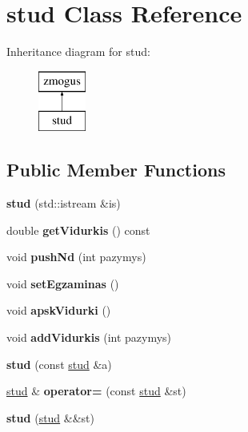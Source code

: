 \hypertarget{classstud}{}\section{stud Class Reference}
\label{classstud}
Inheritance diagram for stud\+:\begin{figure}[H]
\begin{center}
\leavevmode
\includegraphics[height=2.000000cm]{classstud}
\end{center}
\end{figure}
\subsection*{Public Member Functions}
\begin{DoxyCompactItemize}
\item 
\mbox{\label{classstud_a171b5b6e4d70b17f7f9596bfefe22c33}} 
{\bfseries stud} (std\+::istream \&is)
\item 
\mbox{\label{classstud_a8155cc5a0a406299c415d519a3ac650b}} 
double {\bfseries get\+Vidurkis} () const
\item 
\mbox{\label{classstud_aede3c3feab6f7897eb3bb63b808b1c05}} 
void {\bfseries push\+Nd} (int pazymys)
\item 
\mbox{\label{classstud_a3b57cc597a3cf240c21169a905699421}} 
void {\bfseries set\+Egzaminas} ()
\item 
\mbox{\label{classstud_accb8b32f76fbe0273e37ed7a97100fd4}} 
void {\bfseries apsk\+Vidurki} ()
\item 
\mbox{\label{classstud_ae6d83ed059231549979553453a1088cf}} 
void {\bfseries add\+Vidurkis} (int pazymys)
\item 
\mbox{\label{classstud_a9c09ddc686d390c2033457633e205269}} 
{\bfseries stud} (const \mbox{\hyperlink{classstud}{stud}} \&a)
\item 
\mbox{\label{classstud_a833ef07970e5338fee7b82657504c7c8}} 
\mbox{\hyperlink{classstud}{stud}} \& {\bfseries operator=} (const \mbox{\hyperlink{classstud}{stud}} \&st)
\item 
\mbox{\label{classstud_ace4df9e246c16b1b1ec387919e3caf75}} 
{\bfseries stud} (\mbox{\hyperlink{classstud}{stud}} \&\&st)
\end{DoxyCompactItemize}
